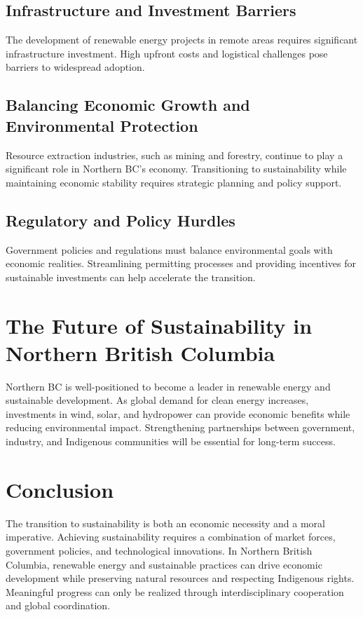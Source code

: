 \documentclass[12pt]{article}
\begin{document}
\subsection{Infrastructure and Investment Barriers}
The development of renewable energy projects in remote areas requires significant infrastructure investment. High upfront costs and logistical challenges pose barriers to widespread adoption.

\subsection{Balancing Economic Growth and Environmental Protection}
Resource extraction industries, such as mining and forestry, continue to play a significant role in Northern BC’s economy. Transitioning to sustainability while maintaining economic stability requires strategic planning and policy support.

\subsection{Regulatory and Policy Hurdles}
Government policies and regulations must balance environmental goals with economic realities. Streamlining permitting processes and providing incentives for sustainable investments can help accelerate the transition.

\section{The Future of Sustainability in Northern British Columbia}
Northern BC is well-positioned to become a leader in renewable energy and sustainable development. As global demand for clean energy increases, investments in wind, solar, and hydropower can provide economic benefits while reducing environmental impact. Strengthening partnerships between government, industry, and Indigenous communities will be essential for long-term success.

\section{Conclusion}
The transition to sustainability is both an economic necessity and a moral imperative. Achieving sustainability requires a combination of market forces, government policies, and technological innovations. In Northern British Columbia, renewable energy and sustainable practices can drive economic development while preserving natural resources and respecting Indigenous rights. Meaningful progress can only be realized through interdisciplinary cooperation and global coordination.
\end{document}
